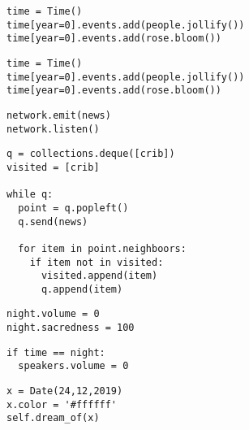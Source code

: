 \documentclass[12pt,a4paper]{article}
\begin{document}
\pagestyle{empty}


\setlength\parindent{0pt}
\setlength{\columnsep}{60pt}

\Large

\begin{lstlisting}
time = Time()
time[year=0].events.add(people.jollify())
time[year=0].events.add(rose.bloom())
\end{lstlisting}

\begin{lstlisting}
time = Time()
time[year=0].events.add(people.jollify())
time[year=0].events.add(rose.bloom())
\end{lstlisting}


\begin{lstlisting}
network.emit(news)
network.listen()
\end{lstlisting}

\begin{lstlisting}
q = collections.deque([crib])
visited = [crib]

while q:
  point = q.popleft()
  q.send(news)

  for item in point.neighboors:
    if item not in visited:
      visited.append(item)
      q.append(item)
\end{lstlisting}


\begin{lstlisting}
night.volume = 0
night.sacredness = 100
\end{lstlisting}

\begin{lstlisting}
if time == night:
  speakers.volume = 0
\end{lstlisting}


\begin{lstlisting}
x = Date(24,12,2019)
x.color = '#ffffff'
self.dream_of(x)
\end{lstlisting}
\end{document}
